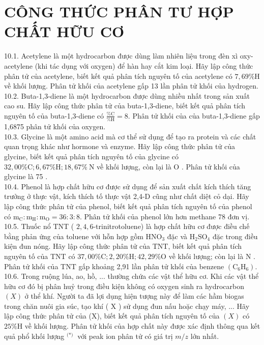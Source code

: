 \documentclass[10pt]{article}
\begin{document}
\section*{CÔNG THỨC PHÂN TƯ HỢP CHẤT HỮU CƠ}
10.1. Acetylene là một hydrocarbon được dùng làm nhiên liệu trong đèn xì oxy-acetylene (khi tác dụng với oxygen) để hàn hay cắt kim loại. Hãy lập công thức phân tử của acetylene, biết kết quả phân tích nguyên tố của acetylene có $7,69 \% \mathrm{H}$ về khối lượng. Phân tử khối của acetylene gấp 13 lần phân tử khối của hydrogen.\\
10.2. Buta-1,3-diene là một hydrocarbon được dùng nhiều nhất trong sản xuất cao su. Hãy lập công thức phân tử của buta-1,3-diene, biết kết quả phân tích nguyên tố của buta-1,3-diene có $\frac{\% \mathrm{C}}{\% \mathrm{H}}=8$. Phân tử khối của của buta-1,3-diene gấp 1,6875 phân tử khối của oxygen.\\
10.3. Glycine là một amino acid mà cơ thể sử dụng để tạo ra protein và các chất quan trọng khác như hormone và enzyme. Hãy lập công thức phân tử của glycine, biết kết quả phân tích nguyên tố của glycine có $32,00 \% \mathrm{C} ; 6,67 \% \mathrm{H} ; 18,67 \% \mathrm{~N}$ về khối lượng, còn lại là O . Phân tử khối của glycine là 75 .\\
10.4. Phenol là hợp chất hữu cơ được sử dụng để sản xuất chất kích thích tăng trưởng ở thực vật, kích thích tố thực vật 2,4-D cũng như chất diệt cỏ dại. Hãy lập công thức phân tử của phenol, biết kết quả phân tích nguyên tố của phenol có $\mathrm{m}_{\mathrm{C}}: \mathrm{m}_{\mathrm{H}}: \mathrm{m}_{\mathrm{O}}=36: 3: 8$. Phân tử khối của phenol lớn hơn methane 78 đơn vị.\\
10.5. Thuốc nổ TNT ( $2,4,6$-trinitrotoluene) là hợp chất hữu cơ được điều chế bằng phản ứng của toluene với hỗn hợp gồm $\mathrm{HNO}_{3}$ đặc và $\mathrm{H}_{2} \mathrm{SO}_{4}$ đặc trong điều kiện đun nóng. Hãy lập công thức phân tử của TNT, biết kết quả phân tích nguyên tố của TNT có $37,00 \% \mathrm{C} ; 2,20 \% \mathrm{H} ; 42,29 \% \mathrm{O}$ về khối lượng; còn lại là N . Phân tử khối của TNT gấp khoảng 2,91 lần phân tử khối của benzene $\left(\mathrm{C}_{6} \mathrm{H}_{6}\right)$.\\
10.6. Trong ruộng lúa, ao, hồ, ... thường chứa các vật thể hữu cơ. Khi các vật thể hữu cơ đó bị phân huỷ trong điều kiện không có oxygen sinh ra hydrocarbon $(X)$ ở thể khí. Người ta đã lợi dụng hiện tượng này để làm các hầm biogas trong chăn nuôi gia súc, tạo khí ( X ) sử dụng đun nấu hoặc chạy máy, ... Hãy lập công thức phân tử của (X), biết kết quả phân tích nguyên tố của $(X)$ có $25 \% \mathrm{H}$ về khối lượng. Phân tử khối của hợp chất này được xác định thông qua kết quả phổ khối lượng ${ }^{\text {(*) }}$ với peak ion phân tử có giá trị $m / z$ lớn nhất.
\end{document}
